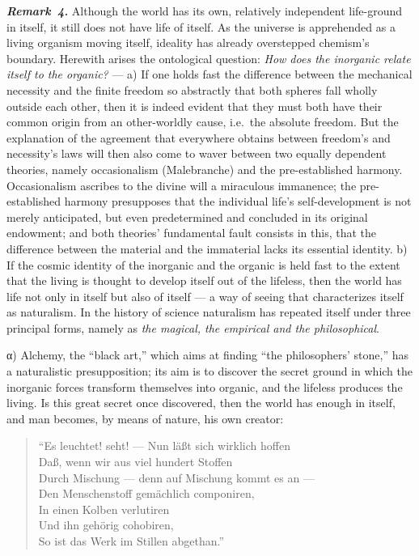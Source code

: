 \documentclass[12pt]{book}
\newcommand{\anm}[1]{\emph{\textbf{Remark~#1.}}}
\begin{document}
\anm{4} Although the world has its own, relatively independent life-ground
in itself, it still does not have life of itself. As the universe is
apprehended as a living organism moving itself, ideality has already
overstepped chemism's boundary. Herewith arises the ontological question:
\emph{How does the inorganic relate itself to the organic?} --- a) If one
holds fast the difference between the mechanical necessity and the finite
freedom so abstractly that both spheres fall wholly outside each other, then
it is indeed evident that they must both have their common origin from an
other-worldly cause, i.e.\ the absolute freedom. But the explanation of the
agreement that everywhere obtains between freedom's and necessity's laws
will then also come to waver between two equally dependent theories, namely
occasionalism (Malebranche) and the pre-established harmony. Occasionalism
ascribes to the divine will a miraculous immanence; the pre-established
harmony presupposes that the individual life's self-development is not
merely anticipated, but even predetermined and concluded in its original
endowment; and both theories' fundamental fault consists in this, that the
difference between the material and the immaterial lacks its essential
identity. b) If the cosmic identity of the inorganic and the organic is held
fast to the extent that the living is thought to develop itself out of the
lifeless, then the world has life not only in itself but also of itself ---
a way of seeing that characterizes itself as naturalism. In the history of
science naturalism has repeated itself under three principal forms, namely
as \emph{the magical, the empirical and the philosophical}.

α) Alchemy, the ``black art,'' which aims at finding ``the philosophers'
stone,'' has a naturalistic presupposition; its aim is to discover the
secret ground in which the inorganic forces transform themselves into
organic, and the lifeless produces the living. Is this great secret once
discovered, then the world has enough in itself, and man becomes, by means
of nature, his own creator:

\begin{verse}
\small
``Es leuchtet! seht! --- Nun läßt sich wirklich hoffen\\
Daß, wenn wir aus viel hundert Stoffen\\
Durch Mischung --- denn auf Mischung kommt es an ---\\
Den Menschenstoff gemächlich componiren,\\
In einen Kolben verlutiren\\
Und ihn gehörig cohobiren,\\
So ist das Werk im Stillen abgethan.''
\end{verse}
\end{document}
